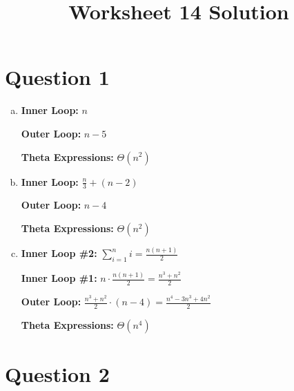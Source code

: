 \documentclass[12pt]{article}
\begin{document}
\title{Worksheet 14 Solution}
\maketitle

\section*{Question 1}
\begin{enumerate}[a.]
    \item

    \textbf{Inner Loop:} $n$

    \textbf{Outer Loop:} $n - 5$

    \textbf{Theta Expressions:} $\Theta (n^2)$

    \item

    \textbf{Inner Loop:} $\displaystyle \frac{n}{3} + (n - 2)$

    \textbf{Outer Loop:} $n - 4$

    \textbf{Theta Expressions:} $\Theta (n^2)$

    \item

    \textbf{Inner Loop \#2:} $\sum\limits_{i=1}^n i = \displaystyle\frac{n(n+1)}{2}$

    \textbf{Inner Loop \#1:} $n \cdot \displaystyle\frac{n(n+1)}{2} = \displaystyle\frac{n^3 + n^2}{2}$

    \textbf{Outer Loop:} $\displaystyle\frac{n^3 + n^2}{2} \cdot (n - 4) = \displaystyle\frac{n^4 - 3n^3 + 4n^2}{2}$

    \textbf{Theta Expressions:} $\Theta (n^4)$


\end{enumerate}

\section*{Question 2}
\end{document}
